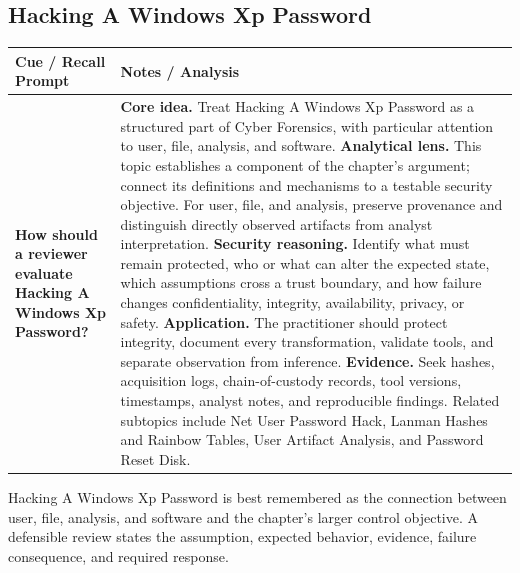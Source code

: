 \documentclass[11pt]{article}
\newcommand{\CornellHeader}{%
\rowcolor{Navy}\color{white}\bfseries Cue / Recall Prompt & \color{white}\bfseries Notes / Analysis\\\hline}
\newcommand{\CornellRow}[2]{%
\cellcolor{CueGray}\RaggedRight\textbf{#1} & \RaggedRight #2\\\hline}
\begin{document}
\subsection*{Hacking A Windows Xp Password}
\begin{longtable}{>{\RaggedRight\arraybackslash}p{}|>{\RaggedRight\arraybackslash}p{}}
\CornellHeader
\CornellRow{How should a reviewer evaluate Hacking A Windows Xp Password?}{\textbf{Core idea.} Treat Hacking A Windows Xp Password as a structured part of Cyber Forensics, with particular attention to user, file, analysis, and software. \textbf{Analytical lens.} This topic establishes a component of the chapter's argument; connect its definitions and mechanisms to a testable security objective. For user, file, and analysis, preserve provenance and distinguish directly observed artifacts from analyst interpretation. \textbf{Security reasoning.} Identify what must remain protected, who or what can alter the expected state, which assumptions cross a trust boundary, and how failure changes confidentiality, integrity, availability, privacy, or safety. \textbf{Application.} The practitioner should protect integrity, document every transformation, validate tools, and separate observation from inference. \textbf{Evidence.} Seek hashes, acquisition logs, chain-of-custody records, tool versions, timestamps, analyst notes, and reproducible findings. Related subtopics include Net User Password Hack, Lanman Hashes and Rainbow Tables, User Artifact Analysis, and Password Reset Disk.}
\end{longtable}
\begin{topicsummary}
Hacking A Windows Xp Password is best remembered as the connection between user, file, analysis, and software and the chapter's larger control objective. A defensible review states the assumption, expected behavior, evidence, failure consequence, and required response.
\end{topicsummary}
\end{document}
